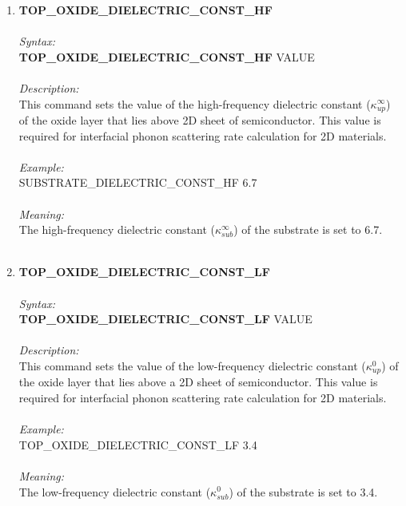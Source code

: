 \documentclass[12pt]{article}
\begin{document}
\begin{enumerate}
    
    \item \textbf{TOP\_OXIDE\_DIELECTRIC\_CONST\_HF} \\  \\
    \textit{Syntax:} \\
    \textbf{TOP\_OXIDE\_DIELECTRIC\_CONST\_HF} VALUE \\ \\
    \textit{Description:} \\
    This command sets the value of the high-frequency dielectric constant ($\kappa_{up}^{\infty}$) of the oxide layer that lies above 2D sheet of semiconductor. This value is required for interfacial phonon scattering rate calculation for 2D materials. \\ \\
    \textit{Example:} \\
    SUBSTRATE\_DIELECTRIC\_CONST\_HF 6.7 \\ \\
    \textit{Meaning:} \\    
    The high-frequency dielectric constant ($\kappa_{sub}^{\infty}$) of the substrate is set to 6.7. \\ \\
   
    \item \textbf{TOP\_OXIDE\_DIELECTRIC\_CONST\_LF}   \\ \\
    \textit{Syntax:} \\
    \textbf{TOP\_OXIDE\_DIELECTRIC\_CONST\_LF} VALUE  \\ \\
    \textit{Description:} \\
    This command sets the value of the low-frequency dielectric constant ($\kappa_{up}^0$) of the oxide layer that lies above a 2D sheet of semiconductor. This value is required for interfacial phonon scattering rate calculation for 2D materials. \\ \\
    \textit{Example:} \\
    TOP\_OXIDE\_DIELECTRIC\_CONST\_LF 3.4 \\ \\
    \textit{Meaning:} \\    
    The low-frequency dielectric constant ($\kappa_{sub}^{0}$) of the substrate is set to 3.4. \\ \\


\end{enumerate}
\end{document}

